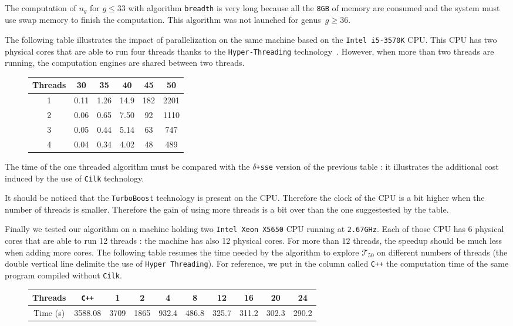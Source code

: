 \documentclass[reqno]{amsart}
\theoremstyle{plain}
\theoremstyle{definition}
\newcommand{\Cilk}{\texttt{Cilk}\xspace}
\renewcommand{\leq}{\leqslant}
\renewcommand{\geq}{\geqslant}
\renewcommand{\tt}[1]{\texttt{#1}}
\begin{document}
The computation of $n_g$ for $g\leq 33$ with algorithm \texttt{breadth} is very 
long because all the \texttt{8GB} of memory are consumed and the system 
must use swap memory to finish the computation. This algorithm was not launched 
for genus~$g\geq 36$.


The following table illustrates the impact of parallelization on the same 
machine based on the \tt{Intel\texttrademark{} i5-3570K} CPU. This CPU has two physical cores that are able 
to run four threads thanks to the \texttt{Hyper-Threading} 
technology~\cite{WikipediaHT}. However, when more 
than two threads are running, the computation engines are shared between two 
threads. 
  
  \begin{figure}[h!]
\begin{tabular}{|c|c|c|c|c|c|} 
\hline
Threads & 30 & 35 & 40 & 45 & 50 \\
\hline
1 &  0.11 & 1.26 & 14.9 & 182 & 2201 \\ 
2 &  0.06 & 0.65 & 7.50 &  92 & 1110\\
3 &  0.05 & 0.44 & 5.14 &  63 & 747 \\
4 &  0.04 & 0.34 & 4.02 &  48 & 489 \\
\hline
\end{tabular}
\end{figure}

\vspace{-0.2em}

The time of the one threaded algorithm  must be compared with the 
\texttt{$\delta$+sse} version of the previous table : it illustrates the 
additional cost induced by the use of \Cilk technology. 

It should be noticed that the \texttt{TurboBoost} technology \cite{WikipediaTB} 
is present on the CPU. Therefore the clock of the CPU is a bit higher when the 
number of threads 
is smaller. Therefore the gain of using more threads is a bit over than the one 
suggestested by the table.

Finally we tested our algorithm on a machine holding two 
\tt{Intel\texttrademark{} Xeon\texttrademark{} X5650} CPU running 
at \texttt{2.67GHz}.
Each of those CPU has 6 physical cores that are able to run 12 threads : the 
machine has also 12 physical cores.  
For more than $12$ threads, the speedup should be much less when
adding more cores. The following table resumes the time needed by the algorithm 
to explore $\mathcal{T}_{50}$ on different numbers of threads (the double 
vertical line delimite the use of \texttt{Hyper Threading}). For reference,
we put in the column called \texttt{C++} the computation time of the same
program compiled without \Cilk.
\begin{figure}[h!]
\begin{tabular}{|c|c|c|c|c|c|c||c|c|c|}
\hline
 Threads & \texttt{C++} & 1 & 2 & 4 & 8 & 12 & 16 & 20 & 24\\
 \hline
 Time (s) & 3588.08 & 3709 & 1865 & 932.4 & 486.8 & 325.7 & 311.2 & 302.3 & 290.2\\
 \hline
\end{tabular}
\end{figure}
\end{document}
